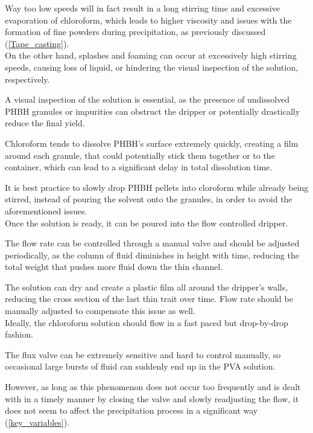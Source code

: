 \documentclass{article}
\begin{document}
        Way too low speeds will in fact result in a long stirring time and excessive evaporation of chloroform, which leads to 
        higher viscosity and issues with the formation of fine powders during precipitation, as previously discussed (\ref{Tape_casting}). \\ 

        On the other hand, splashes and foaming can occur at excessively high stirring speeds, causing loss of liquid, or
        hindering the visual inspection of the solution, respectively. 

        A visual inspection of the solution is essential, as the presence of undissolved PHBH granules or impurities can 
        obstruct the dripper or potentially drastically reduce the final yield. 

        Chloroform tends to dissolve PHBH's surface extremely quickly, creating a film around each granule, that could potentially stick 
        them together or to the container, which can lead to a significant delay in total dissolution time. 

        It is best practice to slowly drop PHBH pellets into cloroform while already being stirred, instead of pouring 
        the solvent onto the granules, in order to avoid the aforementioned issues. \\ 

        Once the solution is ready, it can be poured into the flow controlled dripper. 

        The flow rate can be controlled through a manual valve and should be adjusted periodically, as the column of fluid diminishes 
        in height with time, reducing the total weight that pushes more fluid down the thin channel. 

        The solution can dry and create a plastic film all around the dripper's walls, reducing the cross section of the last thin 
        trait over time. Flow rate should be manually adjusted to compensate this issue as well. \\ 

        Ideally, the chloroform solution should flow in a fast paced but drop-by-drop fashion. 

        The flux valve can be extremely sensitive and hard to control manually, so occasional large bursts of fluid can suddenly 
        end up in the PVA solution. 

        However, as long as this phenomenon does not occur too frequently and is dealt with in a timely manner by closing the valve and slowly 
        readjusting the flow, it does not seem to affect the precipitation process in a significant way (\ref{key_variables}). \\ 
\end{document}
